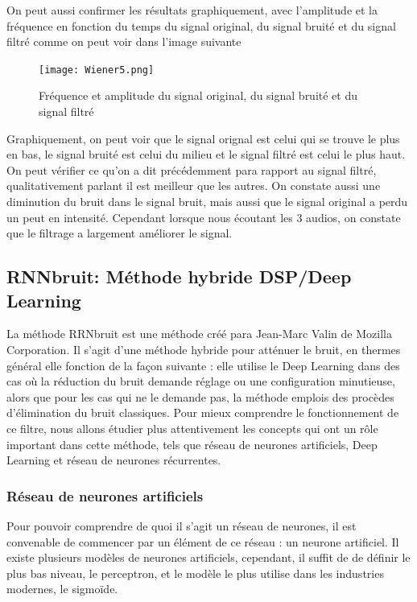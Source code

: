 \documentclass[conference,onecolumn]{IEEEtran}
\begin{document}
On peut aussi confirmer les résultats graphiquement, avec l’amplitude et la fréquence en fonction du temps du signal original, du signal bruité et du signal filtré comme on peut voir dans l’image suivante
\begin{figure}[H]
 \centering
    \texttt{[image: Wiener5.png]}
    \caption{Fréquence et amplitude du signal original, du signal bruité et du signal filtré }
    \medskip
\end{figure}
Graphiquement, on peut voir que le signal orignal est celui qui se trouve le plus en bas, le signal bruité est celui du milieu et le signal filtré est celui le plus haut. On peut vérifier ce qu’on a dit précédemment para rapport au signal filtré, qualitativement parlant il est meilleur que les autres. On constate aussi une diminution du bruit dans le signal bruit, mais aussi que le signal original a perdu un peut en intensité. Cependant lorsque nous écoutant les 3 audios, on constate que le filtrage a largement améliorer le signal.


\subsection{\textbf{RNNbruit: Méthode hybride DSP/Deep Learning}}
La méthode RRNbruit est une méthode créé para Jean-Marc Valin de Mozilla Corporation. Il s’agit d’une méthode hybride pour atténuer le bruit, en thermes général elle fonction de la façon suivante : elle utilise le Deep Learning dans des cas où la réduction du bruit demande réglage ou une configuration minutieuse, alors que pour les cas qui ne le demande pas, la méthode emplois des procèdes d’élimination du bruit classiques. Pour mieux comprendre le fonctionnement de ce filtre, nous allons étudier plus attentivement les concepts qui ont un rôle important dans cette méthode, tels que réseau de neurones artificiels, Deep Learning et réseau de neurones récurrentes.
\hfill\\

\subsubsection{Réseau de neurones artificiels}
Pour pouvoir comprendre de quoi il s’agit un réseau de neurones, il est convenable de commencer par un élément de ce réseau : un neurone artificiel. Il existe plusieurs modèles de neurones artificiels, cependant, il suffit de de définir le plus bas niveau, le perceptron, et le modèle le plus utilise dans les industries modernes, le sigmoïde. 
\hfill\\
\end{document}
